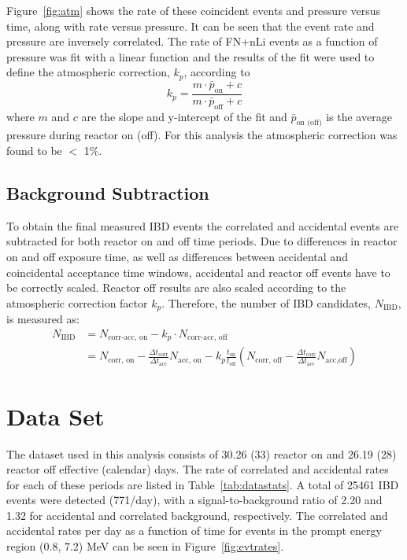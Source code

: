Figure~\ref{fig:atm} shows the rate of these coincident events and pressure versus time, along with rate versus pressure.
It can be seen that the event rate and pressure are inversely correlated. 
The rate of FN+nLi events as a function of pressure was fit with a linear function and the results of the fit were used to define the atmospheric correction, $k_p$, according to
\begin{equation}
k_p = \frac{m \cdot \bar{p}_{\textrm{on}} + c}{m \cdot \bar{p}_{\textrm{off}} + c}
\end{equation}
where $m$ and $c$ are the slope and y-intercept of the fit and $\bar{p}_{\textrm{on (off)}}$ is the average pressure during reactor on (off).
For this analysis the atmospheric correction was found to be $<$ 1\%.


\subsection{Background Subtraction}

To obtain the final measured IBD events the correlated and accidental events are subtracted for both reactor on and off time periods.
Due to differences in reactor on and off exposure time, as well as differences between accidental and coincidental acceptance time windows, accidental and reactor off events have to be correctly scaled.
Reactor off results are also scaled according to the atmospheric correction factor $k_p$.
Therefore, the number of IBD candidates, $N_{\textrm{IBD}}$, is measured as:
\begin{equation}
\begin{split}
	N_{\textrm{IBD}} &= N_{\textrm{corr-acc, on}} - k_p \cdot N_{\textrm{corr-acc, off}} \\
				 &= N_{\textrm{corr, on}} - \frac{\Delta t_{\textrm{corr}}}{\Delta t_{\textrm{acc}}} N_{\textrm{acc, on}} - k_p \frac{t_{\textrm{on}}}{t_{\textrm{off}}}\left(N_{\textrm{corr, off}} - \frac{\Delta t_{\textrm{corr}}}{\Delta t_{\textrm{acc}}}N_{\textrm{acc,off}}\right)
\end{split}
\end{equation}


\section{Data Set}

The dataset used in this analysis consists of 30.26 (33) reactor on and 26.19 (28) reactor off effective (calendar) days.
The rate of correlated and accidental rates for each of these periods are listed in Table~\ref{tab:datastats}.
A total of 25461 IBD events were detected (771/day), with a signal-to-background ratio of 2.20 and 1.32 for accidental and correlated background, respectively.
The correlated and accidental rates per day as a function of time for events in the prompt energy region (0.8, 7.2) MeV can be seen in Figure~\ref{fig:evtrates}.

